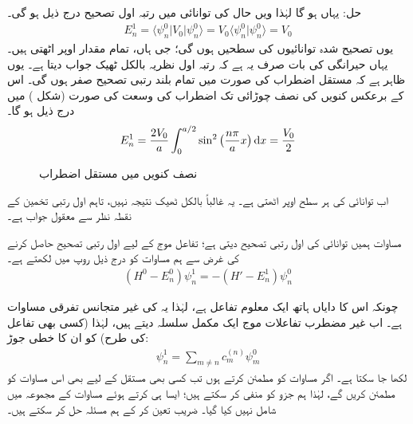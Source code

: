 حل: یہاں  ہو گا لہٰذا  ویں حال کی توانائی میں رتبہ اول تصحیح درج ذیل ہو گی۔
\begin{align*}
E_n^1 = \langle \psi_n^0 | V_0 | \psi_n^0 \rangle = V_0 \langle \psi_n^0 | \psi_n^0 \rangle = V_0
\end{align*}
یوں تصحیح شدہ توانائیوں کی سطحیں  ہوں گی؛ جی ہاں، تمام  مقدار اوپر اٹھتی ہیں۔ یہاں حیرانگی کی بات صرف یہ ہے کہ رتبہ اول نظریہ بالکل ٹھیک جواب دیتا ہے۔ یوں ظاہر ہے کہ مستقل اضطراب کی صورت میں تمام بلند رتبی تصحیح صفر ہوں گی۔  اس کے برعکس کنویں کی نصف چوڑائی تک اضطراب کی وسعت کی صورت (شکل ) میں درج ذیل ہو گا۔
\begin{align*}
E_n^1 = \frac{2V_0}{a} \int_0^{a/2} \sin^2 \big(\frac{n \pi}{a} x\big ) \dif x= \frac{V_0}{2}
\end{align*}
%
\begin{figure}
\centering
{}
\caption{نصف کنویں میں مستقل اضطراب}
\label{شکل_غیر_تابع_اضطراب_نصف_چکور_مستقل_اضطراب}
\end{figure}


اب توانائی کی ہر سطح اوپر اٹھتی ہے۔ یہ غالباً بالکل ٹھیک نتیجہ نہیں، تاہم اول رتبی تخمین کے نقطہ نظر سے معقول جواب ہے۔

 مساوات  ہمیں توانائی کی اول رتبی تصحیح دیتی ہے؛ تفاعل موج کے لیے اول رتبی تصحیح حاصل کرنے کی غرض سے ہم مساوات  کو درج ذیل روپ میں لکھتے ہے۔
\begin{align}\label{مساوات_غیر_اضطراب_تصحیح_اول_توانائی}
(H^0 - E_n^0) \psi_n^1 = - (H' - E_n^1) \psi_n^0
\end{align}

چونکہ اس کا دایاں ہاتھ ایک معلوم تفاعل ہے، لہٰذا یہ  کی غیر متجانس تفرقی مساوات ہے۔ اب غیر مضطرب تفاعلات موج ایک مکمل سلسلہ دیتے ہیں، لہٰذا (کسی بھی تفاعل کی طرح)  کو ان کا خطی جوڑ:
\begin{align}\label{مساوات_غیر_اضطراب_تصحیح_اول_تفاعل}
\psi_n^1 = \sum_{m \ne n} c_m^{(n)} \psi_m^0
\end{align}
 لکھا جا سکتا ہے۔ اگر  مساوات  کو مطمئن کرتے ہوں تب کسی بھی مستقل  کے لیے  بھی اس مساوات کو مطمئن کریں گے، لہٰذا ہم جزو  کو منفی کر سکتے ہیں؛ ایسا ہی کرتے ہوئے مساوات  کے مجموعہ میں  شامل نہیں کیا گیا۔  ضریب   تعین کر کے ہم مسئلہ حل کر سکتے ہیں۔
 
